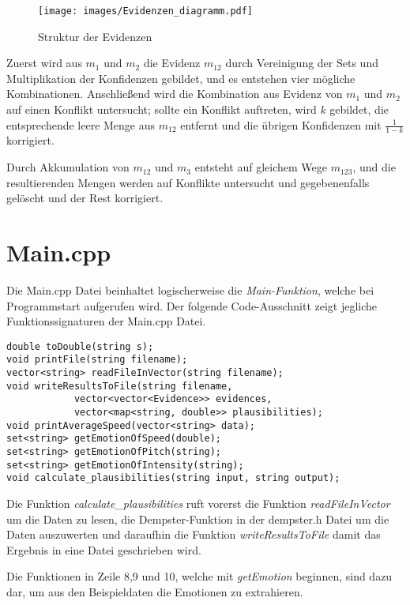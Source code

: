 \begin{figure}
\centering
\texttt{[image: images/Evidenzen\_diagramm.pdf]}
\caption{Struktur der Evidenzen}
\label{diagramm_evidenzen}
\end{figure}

Zuerst wird aus \(m_1\) und \(m_2\) die Evidenz \(m_{12}\) durch Vereinigung der Sets und Multiplikation der Konfidenzen gebildet, und es entstehen vier mögliche Kombinationen. Anschließend wird die Kombination aus Evidenz von \(m_1\) und \(m_2\) auf einen Konflikt untersucht; sollte ein Konflikt auftreten, wird \(k\) gebildet, die entsprechende leere Menge aus \(m_{12}\) entfernt und die übrigen Konfidenzen mit \(\frac{1}{1-k}\) korrigiert.

Durch Akkumulation von \(m_{12}\) und \(m_3\) entsteht auf gleichem Wege \(m_{123}\), und die resultierenden Mengen werden auf Konflikte untersucht und gegebenenfalls gelöscht und der Rest korrigiert. 
 
\section{Main.cpp}
Die Main.cpp Datei beinhaltet logischerweise die \textit{Main-Funktion}, welche bei Programmstart aufgerufen wird.
Der folgende Code-Ausschnitt zeigt jegliche Funktionssignaturen der Main.cpp Datei.

\begin{lstlisting}[caption=Signaturen der Funktionen der Main.cpp Datei, label=Bsp.1]
double toDouble(string s);
void printFile(string filename);
vector<string> readFileInVector(string filename);
void writeResultsToFile(string filename, 
            vector<vector<Evidence>> evidences, 
            vector<map<string, double>> plausibilities);
void printAverageSpeed(vector<string> data);
set<string> getEmotionOfSpeed(double);
set<string> getEmotionOfPitch(string);
set<string> getEmotionOfIntensity(string);
void calculate_plausibilities(string input, string output);
\end{lstlisting}
Die Funktion \textit{calculate\_plausibilities} ruft vorerst die Funktion \textit{readFileInVector} um die Daten zu lesen, die Dempster-Funktion in der dempster.h Datei um die Daten auszuwerten und daraufhin die Funktion \textit{writeResultsToFile} damit das Ergebnis in eine Datei geschrieben wird.


Die Funktionen in Zeile 8,9 und 10, welche mit \textit{getEmotion} beginnen, sind dazu dar, um aus den Beispieldaten die Emotionen zu extrahieren.


